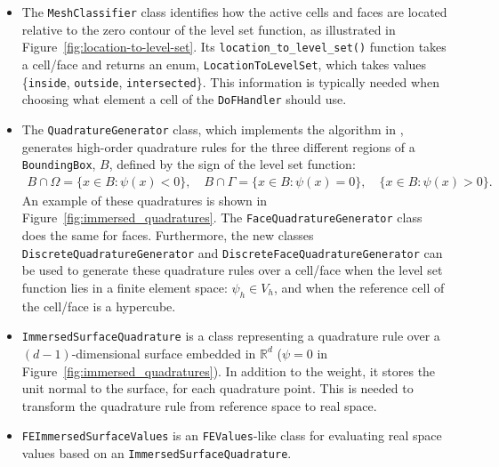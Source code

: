 \documentclass{ansarticle-preprint}
\begin{document}
\begin{itemize}
  \item The \texttt{MeshClassifier} class identifies how the active cells and faces are located relative to the zero contour of the level set function, as illustrated in Figure~\ref{fig:location-to-level-set}. Its \texttt{location\_to\_level\_set()} function takes a cell/face and
        returns an enum, \texttt{LocationToLevelSet}, which takes values \{\texttt{inside}, \texttt{outside}, \texttt{intersected}\}.
        This information is typically needed when choosing what element a cell of the \texttt{DoFHandler} should use.

  \item The \texttt{QuadratureGenerator} class, which implements the algorithm in \cite{saye2015}, generates high-order quadrature rules for the three different regions of a \texttt{BoundingBox}, $B$, defined by the sign of the level set function:
        \begin{align}
          B \cap \Omega = \{ x\in B:  \psi(x) < 0 \},  \quad
          B \cap \Gamma = \{ x\in B:  \psi(x) = 0 \},  \quad
          \{ x\in B:  \psi(x) > 0 \}.
        \end{align}
        An example of these quadratures is shown in Figure~\ref{fig:immersed_quadratures}.
        The \texttt{FaceQuadratureGenerator} class does the same for faces.
        Furthermore, the new classes \texttt{DiscreteQuadratureGenerator} and \newline \texttt{DiscreteFaceQuadratureGenerator} can be used to generate these quadrature rules over a cell/face when the level set function lies in a finite element space: $\psi_h \in V_h$, and when the reference cell of the cell/face is a hypercube.

  \item \texttt{ImmersedSurfaceQuadrature} is a class representing a quadrature rule over a $(d-1)$-dimensional surface embedded in $\mathbb{R}^d$ ($\psi = 0$ in Figure~\ref{fig:immersed_quadratures}). In addition to the weight, it stores the unit normal to the surface, for each quadrature point. This is needed to transform the quadrature rule from reference space to real space.

  \item \texttt{FEImmersedSurfaceValues} is an \texttt{FEValues}-like class for evaluating real space values based on an \texttt{ImmersedSurfaceQuadrature}.


\end{itemize}
\end{document}
